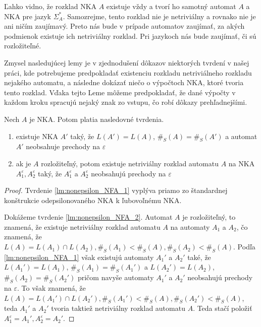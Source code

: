 Ľahko vidno, že rozklad NKA $ A $ existuje vždy a tvorí ho samotný automat $ A $ a NKA pre jazyk $ \Sigma_A^{*} $. Samozrejme, tento rozklad nie je netriviálny a rovnako nie je ani ničím zaujímavý. Preto nás bude v prípade automatov zaujímať, za akých podmienok existuje ich netriviálny rozklad. Pri jazykoch nás bude zaujímať, či sú rozložiteľné.
\par
Zmysel nasledujúcej lemy je v zjednodušení dôkazov niektorých tvrdení v našej práci, kde potrebujeme predpokladať existenciu rozkladu netriviálneho rozkladu nejakého automatu, a následne dokázať niečo o výpočtoch NKA, ktoré tvoria tento rozklad. Vďaka tejto Leme môžeme predpokladať, že dané výpočty v každom kroku spracujú nejaký znak zo vstupu, čo robí dôkazy prehľadnejšími.

\begin{lemma}
\label{lm:nonepsilon_NFA}
Nech $ A $ je NKA. Potom platia nasledovné tvrdenia.

\begin{enumerate}[label=(\alph*)]
\item \label{lm:nonepsilon_NFA_1} existuje NKA $ A' $ taký, že $ L(A')=L(A) $, $ \#_S(A)=\#_S(A') $ a automat $ A' $ neobsahuje prechody na $ \varepsilon $
\item \label{lm:nonepsilon_NFA_2} ak je $ A $ rozložiteľný, potom existuje netriviálny rozklad automatu $ A $ na NKA $ A_1^{\varepsilon}, A_2^{\varepsilon} $ taký, že $ A_1^{\varepsilon} $ a $ A_2^{\varepsilon} $ neobsahujú prechody na $ \varepsilon $
\end{enumerate}
\end{lemma}

\begin{proof}
Tvrdenie \ref{lm:nonepsilon_NFA_1} vyplýva priamo zo štandardnej konštrukcie odepsilonovaného NKA k ľubovoľnému NKA.
\par
Dokážeme tvrdenie \ref{lm:nonepsilon_NFA_2}. Automat $ A $ je rozložiteľný, to znamená, že existuje netriviálny rozklad automatu $ A $ na automaty $ A_1 $ a $ A_2 $, čo znamená, že $ L(A) = L(A_1) \cap L(A_2), \#_S(A_1) < \#_S(A), \#_S(A_2) < \#_S(A) $. Podľa \ref{lm:nonepsilon_NFA_1} však existujú automaty $ A_1' $ a $ A_2' $ také, že $ L(A_1')=L(A_1) $, $ \#_S(A_1)=\#_S(A_1') $ a $ L(A_2')=L(A_2) $, $ \#_S(A_2)=\#_S(A_2') $ pričom navyše automaty $ A_1' $ a $ A_2' $ neobsahujú prechody na $ \varepsilon $. To však znamená, že $ L(A) = L(A_1') \cap L(A_2'), \#_S(A_1') < \#_S(A), \#_S(A_2') < \#_S(A) $, teda $ A_1' $ a $ A_2' $ tvoria taktiež netriviálny rozklad automatu $ A $. Teda stačí položiť $ A_1^{\varepsilon} = A_1', A_2^{\varepsilon} = A_2'$.
\end{proof}

